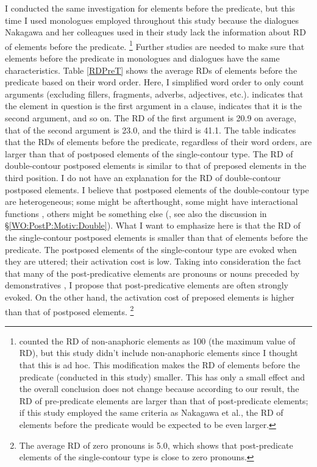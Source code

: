 I conducted the same investigation for elements before the predicate, but this time I used monologues employed throughout this study
because the dialogues Nakagawa and her colleagues used in their study lack the information about RD of elements before the predicate.%
	\footnote{
	 counted the RD of non-anaphoric elements as 100 (the maximum value of RD),
	but this study didn't include non-anaphoric elements
	since I thought that this is ad hoc.
	This modification makes the RD of elements before the predicate (conducted in this study) smaller.
	This has only a small effect and the overall conclusion does not change because
	according to our result,
	the RD of pre-predicate elements are larger than that of post-predicate elements;
	if this study employed the same criteria as Nakagawa et al.,
	the RD of elements before the predicate would be expected to be even larger.
	}
Further studies are needed to make sure that elements before the predicate in monologues and dialogues have the same characteristics.
Table \ref{RDPreT} shows the average RDs of elements before the predicate based on their word order.
Here, I simplified word order to only count arguments (excluding fillers, fragments, adverbs, adjectives, etc.).
 indicates that the element in question is the first argument in a clause,
 indicates that it is the second argument, and so on.
The RD of the first argument is 20.9 on average,
that of the second argument is 23.0, and
the third is 41.1.
The table indicates that the RDs of elements before the predicate,
regardless of their word orders,
are larger than that of postposed elements of the single-contour type.
The RD of double-contour postposed elements is similar to that of preposed elements in the third position.
I do not have an explanation for the RD of double-contour postposed elements.
I believe that postposed elements of the double-contour type are heterogeneous;
some might be afterthought,
some might have interactional functions \cite{ono07},
others might be something else (, see also the discussion in \S \ref{WO:PostP:Motiv:Double}).
What I want to emphasize here is that the RD of the single-contour postposed elements is smaller than that of elements before the predicate.
The postposed elements of the single-contour type are evoked when they are uttered;
their activation cost is low.
Taking into consideration the fact that
many of the post-predicative elements are pronouns or nouns preceded by demonstratives \cite{nakagawaetal08_paper},
I propose that post-predicative elements are often strongly evoked.
On the other hand, the activation cost of preposed elements is higher than that of postposed elements.%
 \footnote{
 The average RD of zero pronouns is 5.0,
 which shows that post-predicate elements of the single-contour type is
 close to zero pronouns.
 }

